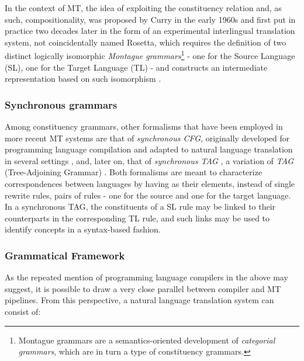 In the context of MT, the idea of exploiting the constituency relation and, as such, compositionality, was proposed by Curry in the early 1960s \cite{curry61} and first put in practice two decades later in the form of an experimental interlingual translation system, not coincidentally named Rosetta, which requires the definition of two distinct logically isomorphic \textit{Montague grammars}\footnote{Montague grammars are a semantics-oriented development of \textit{categorial grammars}, which are in turn a type of constituency grammars.} - one for the Source Language (SL), one for the Target Language (TL) - and constructs an intermediate representation based on such isomorphism \cite{rosetta}. \smallskip

\subsubsection{Synchronous grammars}
Among constituency grammars, other formalisms that have been employed in more recent MT systems are that of \textit{synchronous CFG}, originally developed for programming language compilation \cite{scfg} and adapted to natural language translation in several settings \cite{nlpscfg0,nlpscfg1,nlpscfg2,nlpscfg3}, and, later on, that of \textit{synchronous TAG} \cite{stag}, a variation of \textit{TAG} (Tree-Adjoining Grammar) \cite{tag}.
Both formalisms are meant to characterize correspondences between languages by having as their elements, instead of single rewrite rules, pairs of rules - one for the source and one for the target language. 
In a synchronous TAG, the constituents of a SL rule may be linked to their counterparts in the corresponding TL rule, and such links may be used to identify concepts in a syntax-based fashion. \smallskip

\subsubsection{Grammatical Framework} \label{gf}
As the repeated mention of programming language compilers in the above may suggest, it is possible to draw a very close parallel between compiler and MT pipelines. From this perspective, a natural language translation system can consist of: \smallskip

